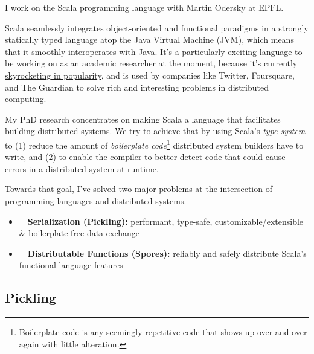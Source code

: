 \documentclass[acmtocl]{acmtrans2m}
\begin{document}


I work on the Scala programming language with Martin Odersky at EPFL.


Scala seamlessly integrates object-oriented and functional paradigms in a
strongly statically typed language atop the Java Virtual Machine (JVM), which
means that it smoothly interoperates with Java. It's a particularly exciting
language to be working on as an academic researcher at the moment, because it's currently
\href{http://www.indeed.com/jobtrends/scala,+groovy+and+java,+erlang,+haskell.html}{skyrocketing in popularity},
and is used by companies like Twitter, Foursquare, and The Guardian to solve
rich and interesting problems in distributed computing.

My PhD research concentrates on making Scala a language that facilitates
building distributed systems. We try to achieve that by using Scala's
\textit{type system} to (1) reduce the amount of \textit{boilerplate code}\footnote{Boilerplate code is any seemingly repetitive code that shows up over and over again with little alteration.} distributed system builders have to write, and
(2) to enable the compiler to better detect code that could cause errors
in a distributed system at runtime.

Towards that goal, I've solved two major problems at the intersection of
programming languages and distributed systems.

\vspace{-0.15in}
\begin{itemize}
\item ~~\textbf{\textsf{Serialization (Pickling):}} performant, type-safe, customizable/extensible \& boilerplate-free data exchange
\item ~~\textbf{\textsf{Distributable Functions (Spores):}} reliably and safely distribute Scala's functional language features
\end{itemize}

\vspace{-0.2in}
\subsection*{\textbf{Pickling}}
\vspace{-0.1in}
\end{document}
